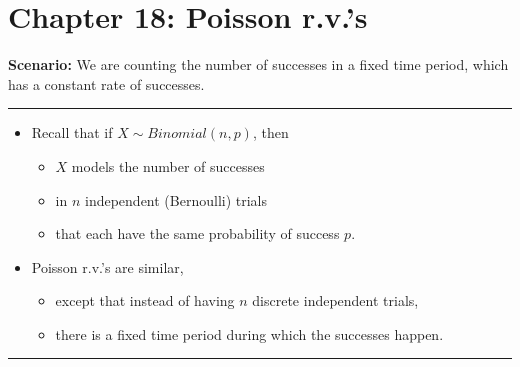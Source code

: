\documentclass[12pt]{amsart}
\begin{document}
\setcounter{section}{18}
{\huge  
\section*{Chapter 18: Poisson r.v.'s}
}

{\large 




\vspace{.5cm}

\textbf{Scenario:} We are counting the number of successes in a fixed time period, which has a constant rate of successes.

\vspace{.5cm}
\hrule
\vspace{.5cm}

\begin{itemize}
\item Recall that if $X\sim Binomial(n,p)$, then 
	\begin{itemize}
	\item $X$ models the number of successes 
	\item in $n$ independent (Bernoulli) trials 
	\item that each have the same probability of success $p$.
	\end{itemize}
\item Poisson r.v.'s are similar, 
	\begin{itemize}
	\item except that instead of having $n$ discrete independent trials, 
	\item there is a fixed time period during which the successes happen.
	\end{itemize}
\end{itemize}

\vspace{.5cm}
\hrule
\vspace{.5cm}

}
\end{document}
